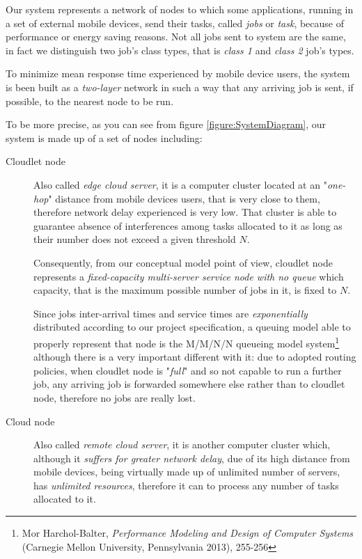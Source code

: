 \documentclass[10pt,a4paper]{article}
\begin{document}
Our system represents a network of nodes to which some applications, running in a set of external mobile devices, send their tasks, called \textit{jobs} or \textit{task}, because of performance or energy saving reasons. Not all jobs sent to system are the same, in fact we distinguish two job's class types, that is \textit{class 1} and \textit{class 2} job's types.

To minimize mean response time experienced by mobile device users, the system is been built as a \textit{two-layer} network in such a way that any arriving job is sent, if possible, to the nearest node to be run.

To be more precise, as you can see from figure \ref{figure:SystemDiagram}, our system is made up of a set of nodes including:

\begin{description}
\item[Cloudlet node] Also called \textit{edge cloud server}, it is a computer cluster located at an "\textit{one-hop}" distance from mobile devices users, that is very close to them, therefore network delay experienced is very low. That cluster is able to guarantee absence of interferences among tasks allocated to it as long as their number does not exceed a given threshold $N$. 

Consequently, from our conceptual model point of view, cloudlet node represents a \textit{fixed-capacity multi-server service node with no queue} which capacity, that is the maximum possible number of jobs in it, is fixed to $N$. 

Since jobs inter-arrival times and service times are \textit{exponentially} distributed according to our project specification, a queuing model able to properly represent that node is the M/M/N/N queueing model system\footnote{Mor Harchol-Balter, \textit{Performance Modeling and Design of Computer Systems} (Carnegie Mellon University, Pennsylvania 2013), 255-256} although there is a very important different with it: due to adopted routing policies, when cloudlet node is "\textit{full}" and so not capable to run a further job, any arriving job is forwarded somewhere else rather than to cloudlet node, therefore no jobs are really lost.

\item[Cloud node] Also called \textit{remote cloud server}, it is another computer cluster which, although it \textit{suffers for greater network delay}, due of its high distance from mobile devices, being virtually made up of unlimited number of servers, has \textit{unlimited resources}, therefore it can to process any number of tasks allocated to it. 


\end{description}
\end{document}
